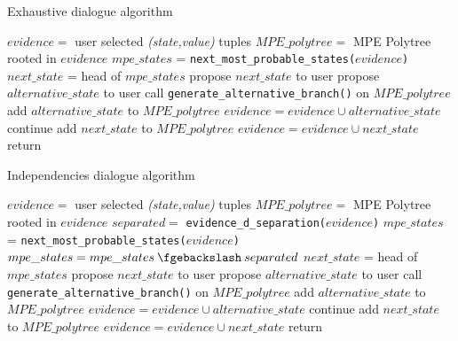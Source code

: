 \begin{algorithm}[htp!]
	\caption{Exhaustive dialogue algorithm}
	\label{alg:pseudo-mpe-exhaustive}
	\begin{algorithmic}[1]
		\State $evidence = $ user selected \textit{(state,value)} tuples
		\State $MPE\_polytree = $ MPE Polytree rooted in $evidence$
			\State $mpe\_states$ = \texttt{next\_most\_probable\_states($evidence$)}
				\State $next\_state$ = head of $mpe\_states$ 
				\State propose $next\_state$ to user 
						\State propose $alternative\_state$ to user 
							\State call \texttt{generate\_alternative\_branch()} on $MPE\_polytree$ 
							\State add $alternative\_state$ to $MPE\_polytree$
							\State $evidence = evidence \cup alternative\_state$
						\Else
							\State continue
						\EndIf
					\EndFor
				\Else
					\State add $next\_state$ to $MPE\_polytree$
					\State $evidence = evidence \cup next\_state$
				\EndIf
			\Else 
				\State return
			\EndIf
		\EndWhile
	\end{algorithmic}
\end{algorithm} 

\begin{algorithm}[htp!]
	\caption{Independencies dialogue algorithm}
	\label{alg:pseudo-mpe-independencies}
	\begin{algorithmic}[1]
		\State $evidence = $ user selected \textit{(state,value)} tuples
		\State $MPE\_polytree = $ MPE Polytree rooted in $evidence$
			\State $separated = $ \texttt{evidence\_d\_separation($evidence$)} 
			\State $mpe\_states$ = \texttt{next\_most\_probable\_states($evidence$)}
			\State $mpe\_states = mpe\_states \mysetminus separated$ 
				\State $next\_state$ = head of $mpe\_states$ 
				\State propose $next\_state$ to user 
						\State propose $alternative\_state$ to user 
							\State call \texttt{generate\_alternative\_branch()} on $MPE\_polytree$ 
							\State add $alternative\_state$ to $MPE\_polytree$
							\State $evidence = evidence \cup alternative\_state$
						\Else
							\State continue 
						\EndIf
					\EndFor
				\Else
					\State add $next\_state$ to $MPE\_polytree$
					\State $evidence = evidence \cup next\_state$
				\EndIf
			\Else 
				\State return 
			\EndIf
		\EndWhile
	\end{algorithmic}
\end{algorithm} 

